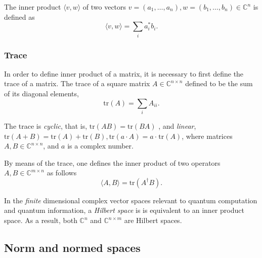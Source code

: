 The inner product $ \langle v, w \rangle$ of two vectors $ v = (a_1, \ldots, a_n ),w = (b_1, \ldots, b_n) \in \mathbb{C}^{n}$ is defined as
\begin{equation*}
  \langle v, w \rangle = \sum_{i} a_i^{\ast} b_i. 
\end{equation*}


\subsubsection{Trace}

In order to define inner product of a matrix, it is necessary to first define the trace of a matrix. The trace of a square matrix $A\in \mathbb{C}^{n\times n}$ defined to be the sum of its diagonal elements,
\begin{equation*}
  \text{tr}(A)= \sum_{i} A_{ii}.
\end{equation*}

The trace is \emph{cyclic}, that is, $\text{tr}(AB) = \text{tr}(BA)$ , and \emph{linear}, $\text{tr}(A + B) = \text{tr}(A)+\text{tr}(B), \text{tr}(a \cdot A) = a\cdot \hspace{1pt} \text{tr}(A)$, where matrices $A, B \in \mathbb{C}^{n\times n}$, and $a$ is a complex number.

By means of the trace, one defines the inner product of two operators $A,B\in \mathbb{C}^{m \times n}$ as follows
\begin{equation} \label{eq:inner_product_matrix}
  \langle A, B \rangle = \text{tr}(A^{\dagger}B).
\end{equation}

In the \emph{finite} dimensional complex vector spaces relevant to quantum computation and quantum information, a \emph{Hilbert space} is is equivalent to an inner product space.  As a result, both $\mathbb{C}^{n}$ and $\mathbb{C}^{n \times m}$ are Hilbert spaces.

\subsection{Norm and normed spaces}

